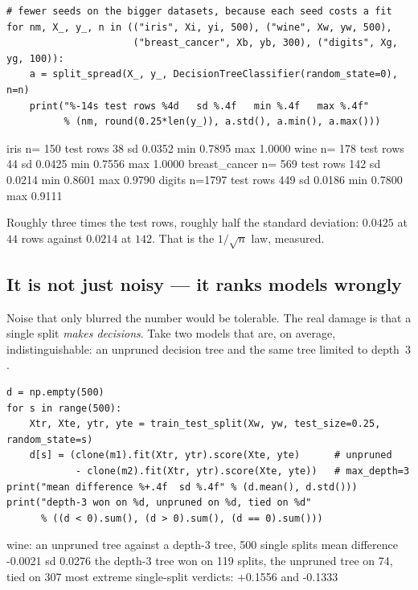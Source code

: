 \documentclass[11pt]{article}
\begin{document}
\begin{lstlisting}
# fewer seeds on the bigger datasets, because each seed costs a fit
for nm, X_, y_, n in (("iris", Xi, yi, 500), ("wine", Xw, yw, 500),
                      ("breast_cancer", Xb, yb, 300), ("digits", Xg, yg, 100)):
    a = split_spread(X_, y_, DecisionTreeClassifier(random_state=0), n=n)
    print("%-14s test rows %4d   sd %.4f   min %.4f   max %.4f"
          % (nm, round(0.25*len(y_)), a.std(), a.min(), a.max()))
\end{lstlisting}
\begin{codeout}
   iris          n= 150  test rows   38   sd 0.0352   min 0.7895   max 1.0000
   wine          n= 178  test rows   44   sd 0.0425   min 0.7556   max 1.0000
   breast_cancer n= 569  test rows  142   sd 0.0214   min 0.8601   max 0.9790
   digits        n=1797  test rows  449   sd 0.0186   min 0.7800   max 0.9111
\end{codeout}

Roughly three times the test rows, roughly half the standard deviation:
$0.0425$ at $44$ rows against $0.0214$ at $142$. That is the $1/\sqrt{n}$ law,
measured.

\subsection{It is not just noisy --- it ranks models wrongly}
\label{sec:ranking}

Noise that only blurred the number would be tolerable. The real damage is that
a single split \emph{makes decisions}. Take two models that are, on average,
indistinguishable: an unpruned decision tree and the same tree limited to
depth~$3$.

\begin{lstlisting}
d = np.empty(500)
for s in range(500):
    Xtr, Xte, ytr, yte = train_test_split(Xw, yw, test_size=0.25, random_state=s)
    d[s] = (clone(m1).fit(Xtr, ytr).score(Xte, yte)      # unpruned
            - clone(m2).fit(Xtr, ytr).score(Xte, yte))   # max_depth=3
print("mean difference %+.4f  sd %.4f" % (d.mean(), d.std()))
print("depth-3 won on %d, unpruned on %d, tied on %d"
      % ((d < 0).sum(), (d > 0).sum(), (d == 0).sum()))
\end{lstlisting}
\begin{codeout}
wine: an unpruned tree against a depth-3 tree, 500 single splits
   mean difference -0.0021  sd 0.0276
   the depth-3 tree won on 119 splits, the unpruned tree on 74, tied on 307
   most extreme single-split verdicts: +0.1556 and -0.1333
\end{codeout}
\end{document}
